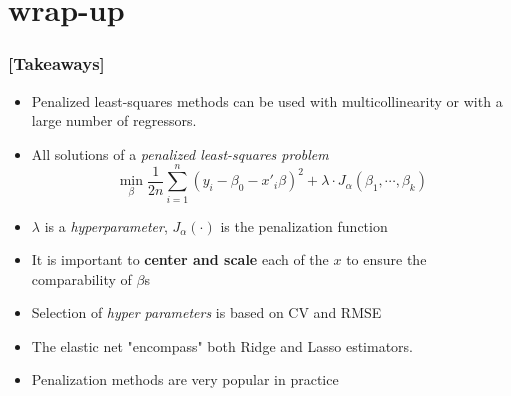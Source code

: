 \documentclass[xcolor=x11names,compress]{beamer}
\renewcommand{\(}{\begin{columns}}
\renewcommand{\)}{\end{columns}}
\newcommand{\<}[1]{\begin{column}{#1}}
\renewcommand{\>}{\end{column}}
\begin{document}
\section{wrap-up}




\begin{frame} %
\frametitle{\textcolor{brique}{[Takeaways]}}
\begin{itemize}[<+->]
\item Penalized least-squares methods can be used with multicollinearity or with a large number of regressors.
\item All solutions of a \textit{penalized least-squares problem}$$
\min_{\beta} \frac{1}{2n}
     \sum_{i=1}^{n}{ \left( y_i - \beta_0 - x'_i\beta\right)^{2} } +
\lambda \cdot J_{\alpha}(\beta_1, \cdots, \beta_k)
$$
\item[] $\lambda$ is a \textit{hyperparameter}, $J_{\alpha}(\cdot)$ is the penalization function
\item It is important to \textbf{center and scale}  each of the $x$ to ensure the comparability of $\beta$s
\item  Selection of \textit{hyper parameters} is based on CV and RMSE
\item The elastic net "encompass" both Ridge and Lasso estimators.
\item Penalization methods are very popular in practice
\end{itemize}
\end{frame}
\end{document}
